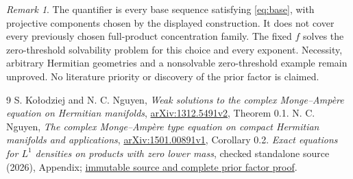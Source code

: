 \documentclass[11pt]{article}
\theoremstyle{remark}\newtheorem{remark}[theorem]{Remark}
\begin{document}
\begin{remark}
The quantifier is every base sequence satisfying \eqref{eq:base},
with projective components chosen by the displayed construction.
It does not cover every previously chosen full-product concentration
family. The fixed $f$ solves the zero-threshold solvability problem
for this choice and every exponent. Necessity, arbitrary Hermitian
geometries and a nonsolvable zero-threshold example remain unproved.
No literature priority or discovery of the prior factor is claimed.
\end{remark}
\begin{thebibliography}{9}
 S. Ko\l odziej and N. C. Nguyen,
\emph{Weak solutions to the complex Monge--Amp\`ere equation on
Hermitian manifolds}, \href{https://arxiv.org/abs/1312.5491v2}{arXiv:1312.5491v2}, Theorem 0.1.
 N. C. Nguyen,
\emph{The complex Monge--Amp\`ere type equation on compact Hermitian
manifolds and applications},
\href{https://arxiv.org/abs/1501.00891v1}{arXiv:1501.00891v1}, Corollary 0.2.
 \emph{Exact equations for $L^1$ densities on products
with zero lower mass}, checked standalone source (2026), Appendix;
\href{https://github.com/MingchenXia/non-kahler-pluripotential-theory/blob/7a244bc4938c5b918f7d906c7201f9385e4188f4/research/papers/P07-zero-lower-mass-product-equations.tex}{immutable source and complete prior factor proof}.
\end{thebibliography}
\end{document}

